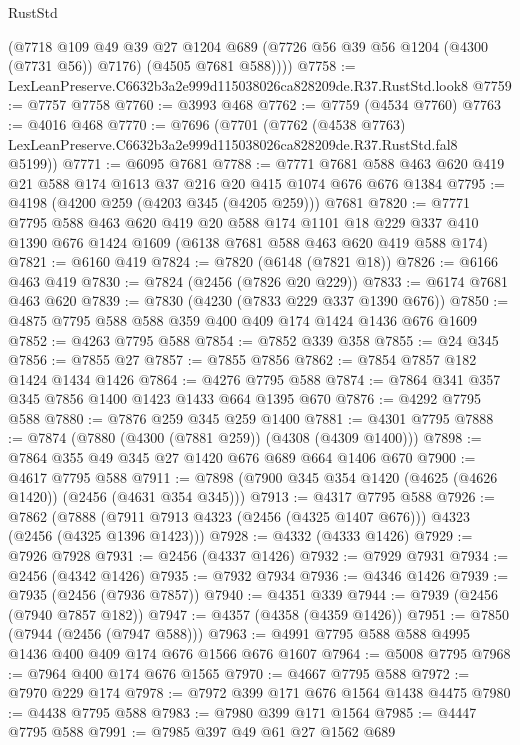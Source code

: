 \begin{lexlean}{RustStd}
\begin{coremodule}
        (@7718
          @109
          @49
          @39
          @27
          @1204
          @689
          (@7726 @56 @39 @56 @1204 (@4300 (@7731 @56)) @7176)
          (@4505 @7681 @588))))
@7758 := LexLeanPreserve.C6632b3a2e999d115038026ca828209de.R37.RustStd.look8
@7759 := @7757 @7758
@7760 := @3993 @468
@7762 := @7759 (@4534 @7760)
@7763 := @4016 @468
@7770 := @7696
    (@7701
      (@7762
        (@4538 @7763)
        LexLeanPreserve.C6632b3a2e999d115038026ca828209de.R37.RustStd.fal8
        @5199))
@7771 := @6095 @7681
@7788 := @7771 @7681 @588 @463 @620 @419 @21 @588 @174 @1613 @37 @216 @20 @415 @1074 @676 @676 @1384
@7795 := @4198 (@4200 @259 (@4203 @345 (@4205 @259))) @7681
@7820 := @7771
    @7795
    @588
    @463
    @620
    @419
    @20
    @588
    @174
    @1101
    @18
    @229
    @337
    @410
    @1390
    @676
    @1424
    @1609
    (@6138 @7681 @588 @463 @620 @419 @588 @174)
@7821 := @6160 @419
@7824 := @7820 (@6148 (@7821 @18))
@7826 := @6166 @463 @419
@7830 := @7824 (@2456 (@7826 @20 @229))
@7833 := @6174 @7681 @463 @620
@7839 := @7830 (@4230 (@7833 @229 @337 @1390 @676))
@7850 := @4875 @7795 @588 @588 @359 @400 @409 @174 @1424 @1436 @676 @1609
@7852 := @4263 @7795 @588
@7854 := @7852 @339 @358
@7855 := @24 @345
@7856 := @7855 @27
@7857 := @7855 @7856
@7862 := @7854 @7857 @182 @1424 @1434 @1426
@7864 := @4276 @7795 @588
@7874 := @7864 @341 @357 @345 @7856 @1400 @1423 @1433 @664 @1395 @670
@7876 := @4292 @7795 @588
@7880 := @7876 @259 @345 @259 @1400
@7881 := @4301 @7795
@7888 := @7874 (@7880 (@4300 (@7881 @259)) (@4308 (@4309 @1400)))
@7898 := @7864 @355 @49 @345 @27 @1420 @676 @689 @664 @1406 @670
@7900 := @4617 @7795 @588
@7911 := @7898 (@7900 @345 @354 @1420 (@4625 (@4626 @1420)) (@2456 (@4631 @354 @345)))
@7913 := @4317 @7795 @588
@7926 := @7862
    (@7888 (@7911 @7913 @4323 (@2456 (@4325 @1407 @676))) @4323 (@2456 (@4325 @1396 @1423)))
@7928 := @4332 (@4333 @1426)
@7929 := @7926 @7928
@7931 := @2456 (@4337 @1426)
@7932 := @7929 @7931
@7934 := @2456 (@4342 @1426)
@7935 := @7932 @7934
@7936 := @4346 @1426
@7939 := @7935 (@2456 (@7936 @7857))
@7940 := @4351 @339
@7944 := @7939 (@2456 (@7940 @7857 @182))
@7947 := @4357 (@4358 (@4359 @1426))
@7951 := @7850 (@7944 (@2456 (@7947 @588)))
@7963 := @4991 @7795 @588 @588 @4995 @1436 @400 @409 @174 @676 @1566 @676 @1607
@7964 := @5008 @7795
@7968 := @7964 @400 @174 @676 @1565
@7970 := @4667 @7795 @588
@7972 := @7970 @229 @174
@7978 := @7972 @399 @171 @676 @1564 @1438 @4475
@7980 := @4438 @7795 @588
@7983 := @7980 @399 @171 @1564
@7985 := @4447 @7795 @588
@7991 := @7985 @397 @49 @61 @27 @1562 @689

\end{coremodule}
\end{lexlean}
